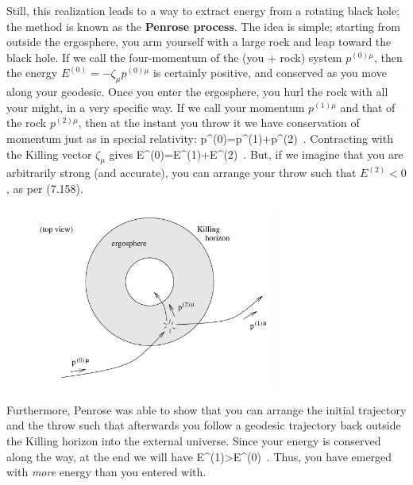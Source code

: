 \documentclass[12pt]{article}
\begin{document}
Still, this realization leads to a way to extract energy from a 
rotating black hole; the method is known as the {\bf Penrose process}.
The idea is simple; starting from outside the ergosphere, you arm
yourself with a large rock and leap toward the black hole.  If we
call the four-momentum of the (you + rock) system $p^{(0)\mu}$, then
the energy $E^{(0)}=-\zeta_\mu p^{(0)\mu}$ is certainly positive,
and conserved as you move along your geodesic.  Once you enter the
ergosphere, you hurl the rock with all your might, in a very
specific way.  If we call your momentum $p^{(1)\mu}$ and that of
the rock $p^{(2)\mu}$, then at the instant you throw it we have
conservation of momentum just as in special relativity:
\be
  p^{(0)\mu}=p^{(1)\mu}+p^{(2)\mu}\ .\label{7.139}
\ee
Contracting with the Killing vector $\zeta_\mu$ gives
\be
  E^{(0)}=E^{(1)}+E^{(2)}\ .\label{7.140}
\ee
But, if we imagine that you are arbitrarily strong (and accurate),
you can arrange your throw such that $E^{(2)}<0$, as per (7.158).
\begin{figure}
  \centerline{
  \includegraphics[height=6cm]{pdf/seven35}}
\end{figure}
Furthermore, Penrose was able to show that you can arrange the
initial trajectory and the throw such that afterwards you follow a
geodesic trajectory back outside the Killing horizon into the
external universe.  Since your energy is conserved along the way,
at the end we will have
\be
  E^{(1)}>E^{(0)}\ .\label{7.141}
\ee
Thus, you have emerged with {\it more} energy than you entered
with.
\end{document}
